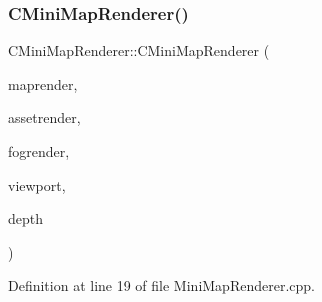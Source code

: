 \subsubsection{\texorpdfstring{C\+Mini\+Map\+Renderer()}{CMiniMapRenderer()}}
{\footnotesize\ttfamily C\+Mini\+Map\+Renderer\+::\+C\+Mini\+Map\+Renderer (\begin{DoxyParamCaption}\item[{std\+::shared\+\_\+ptr$<$ \hyperlink{classCMapRenderer}{C\+Map\+Renderer} $>$}]{maprender,  }\item[{std\+::shared\+\_\+ptr$<$ \hyperlink{classCAssetRenderer}{C\+Asset\+Renderer} $>$}]{assetrender,  }\item[{std\+::shared\+\_\+ptr$<$ \hyperlink{classCFogRenderer}{C\+Fog\+Renderer} $>$}]{fogrender,  }\item[{std\+::shared\+\_\+ptr$<$ \hyperlink{classCViewportRenderer}{C\+Viewport\+Renderer} $>$}]{viewport,  }\item[{gint}]{depth }\end{DoxyParamCaption})}



Definition at line 19 of file Mini\+Map\+Renderer.\+cpp.


